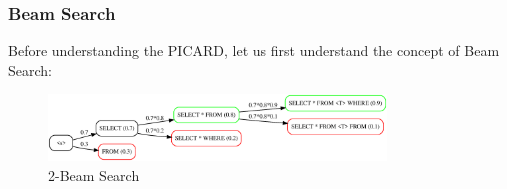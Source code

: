 


\subsubsection*{Beam Search}
Before understanding the PICARD, let us first understand the concept of Beam Search:



\begin{figure}[H]
    \centering
    \includegraphics[width=0.8\textwidth]{pics/picard/beam/beam.eps}
    \caption{2-Beam Search}
    \label{fig:beam_search}
\end{figure}

